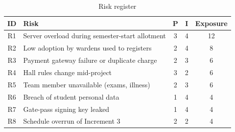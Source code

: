 \documentclass[11pt,a4paper]{report}
\begin{document}
\begin{table}[H]
\centering\small
\caption{Risk register}\label{tab:risk}
\begin{tabularx}{\textwidth}{clccc}
\toprule
\textbf{ID} & \textbf{Risk} & \textbf{P} & \textbf{I} & \textbf{Exposure}\\
\midrule
R1 & Server overload during semester-start allotment & 3 & 4 & 12\\
R2 & Low adoption by wardens used to registers & 2 & 4 & 8\\
R3 & Payment gateway failure or duplicate charge & 2 & 3 & 6\\
R4 & Hall rules change mid-project & 3 & 2 & 6\\
R5 & Team member unavailable (exams, illness) & 2 & 3 & 6\\
R6 & Breach of student personal data & 1 & 4 & 4\\
R7 & Gate-pass signing key leaked & 1 & 4 & 4\\
R8 & Schedule overrun of Increment 3 & 2 & 2 & 4\\
\bottomrule
\end{tabularx}
\end{table}
\end{document}
